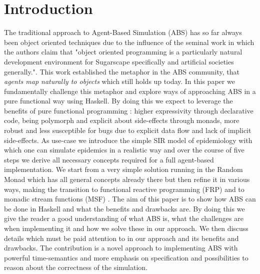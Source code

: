 \section{Introduction}
The traditional approach to Agent-Based Simulation (ABS) has so far always been object oriented techniques due to the influence of the seminal work \cite{epstein_growing_1996} in which the authors claim that "object oriented programming is a particularly natural development environment for Sugarscape specifically and artificial societies generally.". This work established the metaphor in the ABS community, that \textit{agents map naturally to objects} which still holds up today.
In this paper we fundamentally challenge this metaphor and explore ways of approaching ABS in a pure functional way using Haskell. By doing this we expect to leverage the benefits of pure functional programming \cite{hudak_history_2007}: higher expressivity through declarative code, being polymorph and explicit about side-effects through monads, more robust and less susceptible for bugs due to explicit data flow and lack of implicit side-effects.
As use-case we introduce the simple SIR model of epidemiology with which one can simulate epidemics in a realistic way and over the course of five steps we derive all necessary concepts required for a full agent-based implementation. We start from a very simple solution running in the Random Monad which has all general concepts already there but then refine it in various ways, making the transition to functional reactive programming (FRP) \cite{wan_functional_2000} and to monadic stream functions (MSF) \cite{perez_functional_2016}.
The aim of this paper is to show how ABS can be done in Haskell and what the benefits and drawbacks are. By doing this we give the reader a good understanding of what ABS is, what the challenges are when implementing it and how we solve these in our approach. We then discuss details which must be paid attention to in our approach and its benefits and drawbacks. The contribution is a novel approach to implementing ABS with powerful time-semantics and more emphasis on specification and possibilities to reason about the correctness of the simulation. %